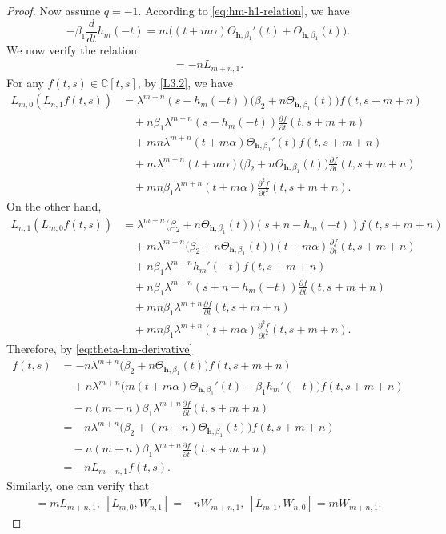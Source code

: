 \documentclass[a4paper]{amsart}
\numberwithin{equation}{section}
\begin{document}
\begin{proof}
Now assume $q=-1$. 
	According to \eqref{eq:hm-h1-relation}, we have
	\begin{equation}\label{eq:theta-hm-derivative}
		-\beta_1\frac{d}{dt}h_m(-t)
		=m\bigl((t+m\alpha)\Theta_{\mathbf h,\beta_1}'(t)
		+\Theta_{\mathbf h,\beta_1}(t)\bigr).
	\end{equation}
		We now verify the relation
		\begin{align*}
		[L_{m,0},L_{n,1}]=-nL_{m+n,1}.
		\end{align*}
		For any $f(t,s)\in \mathbb C[t,s]$, by \eqref{L3.2}, we have
		\begin{align*}
		L_{m,0}(L_{n,1}f(t,s))
		&=\lambda^{m+n}(s-h_m(-t))
		\bigl(\beta_2+n\Theta_{\mathbf h,\beta_1}(t)\bigr)f(t,s+m+n)\\
		&\quad+n\beta_1\lambda^{m+n}(s-h_m(-t))
		\frac{\partial f}{\partial t}(t,s+m+n)\\
		&\quad+mn\lambda^{m+n}(t+m\alpha)
		\Theta_{\mathbf h,\beta_1}'(t)f(t,s+m+n)\\
		&\quad+m\lambda^{m+n}(t+m\alpha)
		\bigl(\beta_2+n\Theta_{\mathbf h,\beta_1}(t)\bigr)
		\frac{\partial f}{\partial t}(t,s+m+n)\\
		&\quad+mn\beta_1\lambda^{m+n}(t+m\alpha)
		\frac{\partial^2f}{\partial t^2}(t,s+m+n).
		\end{align*}
		On the other hand,
		\begin{align*}
		L_{n,1}(L_{m,0}f(t,s))
		&=\lambda^{m+n}\bigl(\beta_2+n\Theta_{\mathbf h,\beta_1}(t)\bigr)
		(s+n-h_m(-t))f(t,s+m+n)\\
		&\quad+m\lambda^{m+n}\bigl(\beta_2+n\Theta_{\mathbf h,\beta_1}(t)\bigr)
		(t+m\alpha)\frac{\partial f}{\partial t}(t,s+m+n)\\
		&\quad+n\beta_1\lambda^{m+n}h_m'(-t)f(t,s+m+n)\\
		&\quad+n\beta_1\lambda^{m+n}(s+n-h_m(-t))
		\frac{\partial f}{\partial t}(t,s+m+n)\\
		&\quad+mn\beta_1\lambda^{m+n}\frac{\partial f}{\partial t}(t,s+m+n)\\
		&\quad+mn\beta_1\lambda^{m+n}(t+m\alpha)
		\frac{\partial^2f}{\partial t^2}(t,s+m+n).
		\end{align*}
		Therefore, by \eqref{eq:theta-hm-derivative}
		\begin{align*}
		[L_{m,0},L_{n,1}]f(t,s)
		&=-n\lambda^{m+n}\bigl(\beta_2+n\Theta_{\mathbf h,\beta_1}(t)\bigr)f(t,s+m+n)\\
		&\quad+n\lambda^{m+n}\bigl(m(t+m\alpha)\Theta_{\mathbf h,\beta_1}'(t)
		-\beta_1h_m'(-t)\bigr)f(t,s+m+n)\\
		&\quad-n(m+n)\beta_1\lambda^{m+n}\frac{\partial f}{\partial t}(t,s+m+n)\\
		&=-n\lambda^{m+n}\bigl(\beta_2+(m+n)\Theta_{\mathbf h,\beta_1}(t)\bigr)f(t,s+m+n)\\
		&\quad-n(m+n)\beta_1\lambda^{m+n}\frac{\partial f}{\partial t}(t,s+m+n)\\
		&=-nL_{m+n,1}f(t,s).
		\end{align*}
		Similarly, one can verify that
		\begin{align*}
		[L_{m,1},L_{n,0}]=mL_{m+n,1},\ 
		[L_{m,0},W_{n,1}]=-nW_{m+n,1},\ 
		[L_{m,1},W_{n,0}]=mW_{m+n,1}.
		\end{align*}
	

\end{proof}
\end{document}
